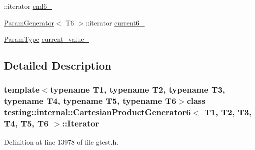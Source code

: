 \begin{DoxyCompactItemize}
\-::iterator \hyperlink{classtesting_1_1internal_1_1CartesianProductGenerator6_1_1Iterator_aa7a82d43bb33f76b3ae3a87435d3e97e}{end6\-\_\-}
\item 
\hyperlink{classtesting_1_1internal_1_1ParamGenerator}{\-Param\-Generator}$<$ \-T6 $>$\-::iterator \hyperlink{classtesting_1_1internal_1_1CartesianProductGenerator6_1_1Iterator_ab8337df5dbe6ea9aeac0a56c7ef816f9}{current6\-\_\-}
\item 
\hyperlink{classtesting_1_1internal_1_1CartesianProductGenerator6_a2f46503012c4ef785ad3fe03defbc7e1}{\-Param\-Type} \hyperlink{classtesting_1_1internal_1_1CartesianProductGenerator6_1_1Iterator_a1b76a85d1482a16a96efc293e8384512}{current\-\_\-value\-\_\-}
\end{DoxyCompactItemize}


\subsection{\-Detailed \-Description}
\subsubsection*{template$<$typename T1, typename T2, typename T3, typename T4, typename T5, typename T6$>$class testing\-::internal\-::\-Cartesian\-Product\-Generator6$<$ T1, T2, T3, T4, T5, T6 $>$\-::\-Iterator}



\-Definition at line 13978 of file gtest.\-h.



